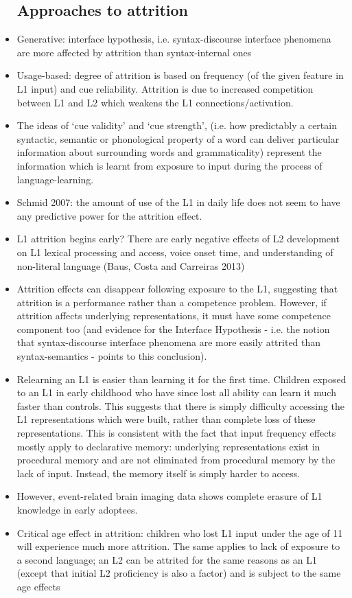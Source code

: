 \documentclass{article}
\begin{document}
\begin{itemize}
    \subsection{Approaches to attrition}
    \item Generative: interface hypothesis, i.e. syntax-discourse interface phenomena are more affected by attrition than syntax-internal ones 
    \item Usage-based: degree of attrition is based on frequency (of the given feature in L1 input) and cue reliability. Attrition is due to increased competition between L1 and L2 which weakens the L1 connections/activation.
    \item The ideas of ‘cue validity’ and ‘cue strength’, (i.e. how predictably a certain syntactic, semantic or phonological property of a word can deliver particular information about surrounding words and grammaticality) represent the information which is learnt from exposure to input during the process of language-learning.
    \item Schmid 2007: the amount of use of the L1 in daily life does not seem to have any predictive power for the attrition effect.
    \item L1 attrition begins early? There are early negative effects of L2 development on L1 lexical processing and access, voice onset time, and understanding of non-literal language (Baus, Costa and Carreiras 2013)
    \item Attrition effects can disappear following exposure to the L1, suggesting that attrition is a performance rather than a competence problem. However, if attrition affects underlying representations, it must have some competence component too (and evidence for the Interface Hypothesis - i.e. the notion that syntax-discourse interface phenomena are more easily attrited than syntax-semantics - points to this conclusion).
    \item Relearning an L1 is easier than learning it for the first time. Children exposed to an L1 in early childhood who have since lost all ability can learn it much faster than controls. This suggests that there is simply difficulty accessing the L1 representations which were built, rather than complete loss of these representations. This is consistent with the fact that input frequency effects mostly apply to declarative memory: underlying representations exist in procedural memory and are not eliminated from procedural memory by the lack of input. Instead, the memory itself is simply harder to access.
    \item However, event-related brain imaging data shows complete erasure of L1 knowledge in early adoptees.
    \item Critical age effect in attrition: children who lost L1 input under the age of 11 will experience much more attrition. The same applies to lack of exposure to a second language; an L2 can be attrited for the same reasons as an L1 (except that initial L2 proficiency is also a factor) and is subject to the same age effects
\end{itemize}
\end{document}
